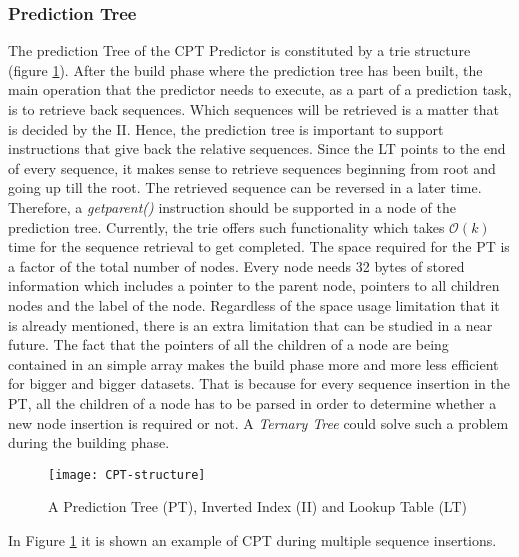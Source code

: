\subsubsection*{Prediction Tree}
The prediction Tree of the CPT Predictor is constituted by a trie structure (figure \ref{fig:CPT-structure}). After the build phase where the prediction tree has been built, the main operation that the predictor needs to execute, as a part of a prediction task, is to retrieve back sequences. Which sequences will be retrieved is a matter that is decided by the II. Hence, the prediction tree is important to support instructions that give back the relative sequences. Since the LT points to the end of every sequence, it makes sense to retrieve sequences beginning from root and going up till the root. The retrieved sequence can be reversed in a later time. Therefore, a \emph{getparent()} instruction should be supported in a node of the prediction tree. Currently, the trie offers such functionality which takes \(\mathcal{O}(k)\) time for the sequence retrieval to get completed. The space required for the PT is a factor of the total number of nodes. Every node needs 32 bytes of stored information which includes a pointer to the parent node, pointers to all children nodes and the label of the node. Regardless of the space usage limitation that it is already mentioned, there is an extra limitation that can be studied in a near future. The fact that the pointers of all the children of a node are being contained in an simple array makes the build phase more and more less efficient for bigger and bigger datasets. That is because for every sequence insertion in the PT, all the children of a node has to be parsed in order to determine whether a new node insertion is required or not. A \emph{Ternary Tree} \cite{bentley_fast_1997} could solve such a problem during the building phase.

\begin{figure}[h]
    \centering
    \texttt{[image: CPT-structure]}
    \caption{A Prediction Tree (PT), Inverted Index (II) and Lookup Table (LT)}
    \label{fig:CPT-structure}
\end{figure}

In Figure \ref{fig:CPT-structure} it is shown an example of CPT during multiple sequence insertions.

